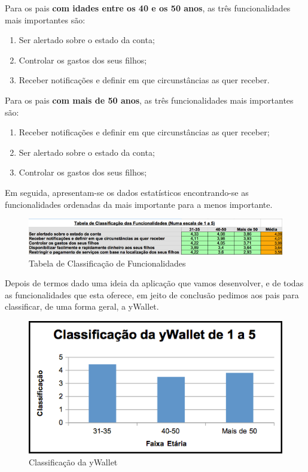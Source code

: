 \documentclass{article}
\begin{document}
      Para os pais \textbf{com idades entre os 40 e os 50 anos}, as três funcionalidades mais importantes são:

      \begin{enumerate}
        \item Ser alertado sobre o estado da conta;
        \item Controlar os gastos dos seus filhos;
        \item Receber notificações e definir em que circunstâncias as quer receber.
      \end{enumerate} 

      Para os pais \textbf{com mais de 50 anos}, as três funcionalidades mais importantes são:

      \begin{enumerate}
        \item Receber notificações e definir em que circunstâncias as quer receber;
        \item Ser alertado sobre o estado da conta;
        \item Controlar os gastos dos seus filhos;
      \end{enumerate}

      Em seguida, apresentam-se os dados estatísticos encontrando-se as funcionalidades ordenadas da mais importante para a menos importante.

      \begin{figure}[ht!]
        \centering
          \includegraphics[width=0.7\linewidth]{img/img12}
          \caption{Tabela de Classificação de Funcionalidades}
          \label{img12}
      \end{figure}

      Depois de termos dado uma ideia da aplicação que vamos desenvolver, e de todas as funcionalidades que esta oferece, em jeito de conclusão pedimos aos pais para classificar, de uma forma geral, a yWallet. 

      \begin{figure}[ht!]
        \centering
          \includegraphics[width=0.7\linewidth]{img/img13}
          \caption{Classificação da yWallet}
          \label{img13}
      \end{figure}
\end{document}
